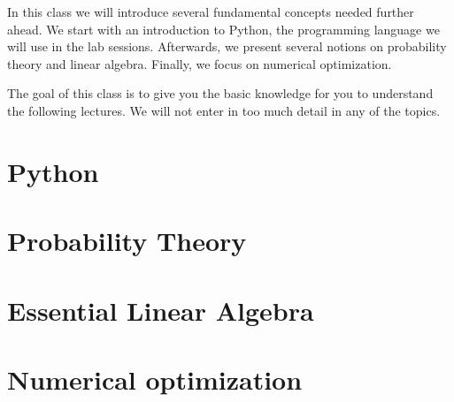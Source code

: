 
In this class we will introduce several fundamental concepts needed further ahead. We start with an introduction to Python, the programming language we will use in the lab sessions. Afterwards, we present several notions on probability theory and linear algebra. Finally, we focus on numerical optimization. 

The goal of this class is to give you the basic knowledge for you to understand the following lectures. We will not enter in too much detail in any of the topics. 


\section{Python}


\section{Probability Theory}


\section{Essential Linear Algebra}


\section{Numerical optimization}







